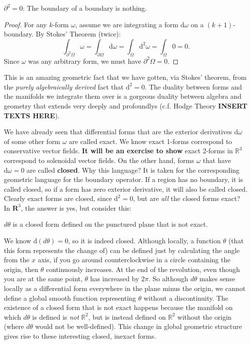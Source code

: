 	\begin{cor}
		$\partial^2 = 0$: The boundary of a boundary is nothing. 
	\end{cor}
	\begin{proof}
		For any $k$-form $\omega$, assume we are integrating a form $\mathrm d \omega$ on a $(k+1)$-boundary. By Stokes' Theorem (twice):
		\begin{equation*}
			\int_{\partial^2 \Omega} \omega = \int_{\partial \Omega} \mathrm d \omega = \int_{\Omega} \mathrm d^2 \omega = \int_\Omega 0 = 0.
		\end{equation*}
		Since $\omega$ was any arbitrary form, we must have $\partial^2 \Omega = 0$.
	\end{proof}
	This is an amazing geometric fact that we have gotten, via Stokes' theorem, from the \emph{purely algebraically derived} fact that $\mathrm d^2 = 0$. The duality between forms and the manifolds we integrate them over is a gorgeous duality between algebra and geometry that extends very deeply and profoundlys (c.f. Hodge Theory \textbf{INSERT TEXTS HERE}).
	
	We have already seen that differential forms that are the exterior derivatives $\mathrm d \omega$ of some other form $\omega$ are called exact. We know exact 1-forms correspond to conservative vector fields. \textbf{It will be an exercise to show} exact 2-forms in $\mathbb R^3$ correspond to solenoidal vector fields. On the other hand, forms $\omega$ that have $\mathrm d \omega = 0$ are called \textbf{closed}. Why this language? It is taken for the corresponding geometric language for the boundary operator. If a region has no boundary, it is called closed, so if a form has zero exterior derivative, it will also be called closed. Clearly exact forms are closed, since $\mathrm d^2 = 0$, but are \emph{all} the closed forms exact? In $\mathbf{R}^3$, the answer is yes, but consider this:
	
	\begin{example}
		$d\theta$ is a closed form defined on the punctured plane that is not exact. 
	\end{example}
	
	We know $\mathrm d (d\theta) = 0$, so it is indeed closed. Although locally, a function $\theta$ (that this form represents the change of) can be defined just by calculating the angle from the $x$ axis, if you go around counterclockwise in a circle containing the origin, then $\theta$ continuously increases. At the end of the revolution, even though you are at the same point, $\theta$ has increased by $2\pi$. So although $d\theta$ makes sense locally as a differential form everywhere in the plane minus the origin, we cannot define a global smooth function representing $\theta$ without a discontinuity. The existence of a closed form that is not exact happens because the manifold on which $d\theta$ is defined is \emph{not} $\mathbb R^2$, but is instead defined on $\mathbb{R}^2$ without the origin (where $d\theta$ would not be well-defined). This change in global geometric structure gives rise to these interesting closed, inexact forms. 
	
